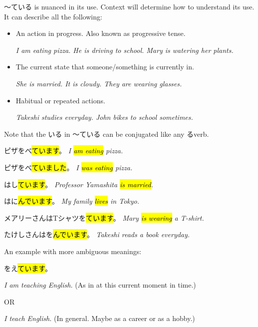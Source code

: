     {
    〜ている is nuanced in its use. Context will determine how to understand its use. It can describe all the following:
    \begin{itemize}
        \item An action in progress. Also known as progressive tense.
        
        \textit{I am eating pizza. He is driving to school. Mary is watering her plants.}
        \item The current state that someone/something is currently in.
        
        \textit{She is married. It is cloudy. They are wearing glasses.}
        \item Habitual or repeated actions.
        
        \textit{Takeshi studies everyday. John bikes to school sometimes.}
    \end{itemize}

    Note that the いる in 〜ている can be conjugated like any るverb.

    ピザをべ\hl{ています}。
    \textit{I \hl{am eating} pizza.}

    ピザをべ\hl{ていました}。
    \textit{I \hl{was eating} pizza.}

    はし\hl{ています}。
    \textit{Professor Yamashita \hl{is married}.}

    はに\hl{んでいます}。
    \textit{My family \hl{lives} in Tokyo.}

    メアリーさんはTシャツを\hl{ています}。
    \textit{Mary \hl{is wearing} a T-shirt.}

    たけしさんはを\hl{んでいます}。
    \textit{Takeshi reads a book everyday.}

    \sectionSplit

    An example with more ambiguous meanings:

    をえ\hl{ています}。

    \textit{I am teaching English.} (As in at this current moment in time.)

    OR

    \textit{I teach English.} (In general. Maybe as a career or as a hobby.)
    }

